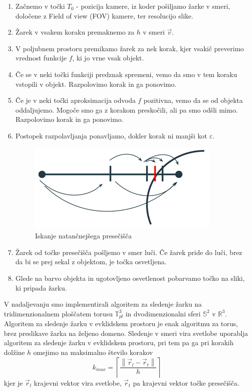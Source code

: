 \documentclass[titlepage]{article}
\begin{document}
\bigskip
\begin{enumerate}

\item Začnemo v točki \( T_{0} \) - pozicija kamere, iz koder pošiljamo žarke v smeri, določene z Field of view (FOV) kamere, ter resolucijo slike. 
\item Žarek v vsakem koraku premaknemo za \( h \) v smeri \(\vec{v}\).
\item V poljubnem prostoru premikamo žarek za nek korak, kjer vsakič preverimo vrednost funkcije \( f \), ki jo vrne vsak objekt.
\item Če se v neki točki funkciji predznak spremeni, vemo da smo v tem koraku vstopili v objekt. Razpolovimo korak in ga ponovimo.
\item Če je v neki točki aproksimacija odvoda \( f \) pozitivna, vemo da se od objekta oddaljujemo. Mogoče smo ga z korakom preskočili, ali pa smo odšli mimo. Razpolovimo korak in ga ponovimo.
\item Postopek razpolavljanja ponavljamo, dokler korak ni manjši kot \( \varepsilon \).

\begin{figure}[H]
    \centering
    \includegraphics[width=0.5\linewidth]{intersect.png}
    \caption{Iskanje natančnejšega presečišča}
    \label{Slika:Iskanje natančnejšega presečišča}
\end{figure}

\item Žarek od točke presečišča pošljemo v smer luči. Če žarek pride do luči, brez da bi se prej sekal z objektom, je točka osvetljena.
\item Glede na barvo objekta in ugotovljeno osvetlenost pobarvamo točko na sliki, ki pripada žarku.
\end{enumerate}

\bigskip
V nadaljevanju smo implementirali algoritem za sledenje žarku na tridimenzionalnem ploščatem torusu \( \mathbb{T}_{pl}^{3} \) in dvodimenzionalni sferi \( \mathbb{S}^2 \) v \( \mathbb{R}^3 \). Algoritem za sledenje žarku v evklidskem prostoru je enak algoritmu za torus, brez preslikave žarka na željeno domeno. Sledenje v smeri vira svetlobe uporablja algoritem za sledenje žarku v evklidskem prostoru, pri tem pa ga pri korakih dolžine \( h \) omejimo na maksimalno število korakov
\[ k_{max}= \left \lceil \frac{\left \|\vec{r}_{l}-\vec{r}_{t} \right \|}{h} \right \rceil \]
kjer je \( \vec{r}_{l} \) krajevni vektor vira svetlobe, \( \vec{r}_{t} \) pa krajevni vektor točke presečišča.
\end{document}
